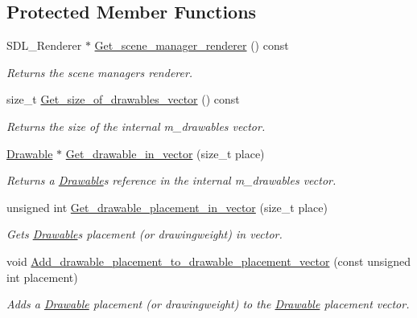 \subsection*{Protected Member Functions}
\begin{DoxyCompactItemize}
\item 
S\+D\+L\+\_\+\+Renderer $\ast$ \hyperlink{classjetfuel_1_1draw_1_1Scene_abb0c1a20e3bb87167c75ada894acd60b}{Get\+\_\+scene\+\_\+manager\+\_\+renderer} () const
\begin{DoxyCompactList}\small\item\em Returns the scene manager\textquotesingle{}s renderer. \end{DoxyCompactList}\item 
size\+\_\+t \hyperlink{classjetfuel_1_1draw_1_1Scene_a62423470cca53acd55ff174d6e37d730}{Get\+\_\+size\+\_\+of\+\_\+drawables\+\_\+vector} () const
\begin{DoxyCompactList}\small\item\em Returns the size of the internal m\+\_\+drawables vector. \end{DoxyCompactList}\item 
\hyperlink{classjetfuel_1_1draw_1_1Drawable}{Drawable} $\ast$ \hyperlink{classjetfuel_1_1draw_1_1Scene_ad22707818e9de20b28d82646ca460141}{Get\+\_\+drawable\+\_\+in\+\_\+vector} (size\+\_\+t place)
\begin{DoxyCompactList}\small\item\em Returns a \hyperlink{classjetfuel_1_1draw_1_1Drawable}{Drawable}\textquotesingle{}s reference in the internal m\+\_\+drawables vector. \end{DoxyCompactList}\item 
unsigned int \hyperlink{classjetfuel_1_1draw_1_1Scene_a92228a8f31c8e2e1fe1e3d0a12940b1a}{Get\+\_\+drawable\+\_\+placement\+\_\+in\+\_\+vector} (size\+\_\+t place)
\begin{DoxyCompactList}\small\item\em Gets \hyperlink{classjetfuel_1_1draw_1_1Drawable}{Drawable}\textquotesingle{}s placement (or drawingweight) in vector. \end{DoxyCompactList}\item 
void \hyperlink{classjetfuel_1_1draw_1_1Scene_a4ab618141cf7e10c95cbe7b114688c1a}{Add\+\_\+drawable\+\_\+placement\+\_\+to\+\_\+drawable\+\_\+placement\+\_\+vector} (const unsigned int placement)
\begin{DoxyCompactList}\small\item\em Adds a \hyperlink{classjetfuel_1_1draw_1_1Drawable}{Drawable} placement (or drawingweight) to the \hyperlink{classjetfuel_1_1draw_1_1Drawable}{Drawable} placement vector. \end{DoxyCompactList}\item 

\end{DoxyCompactItemize}
